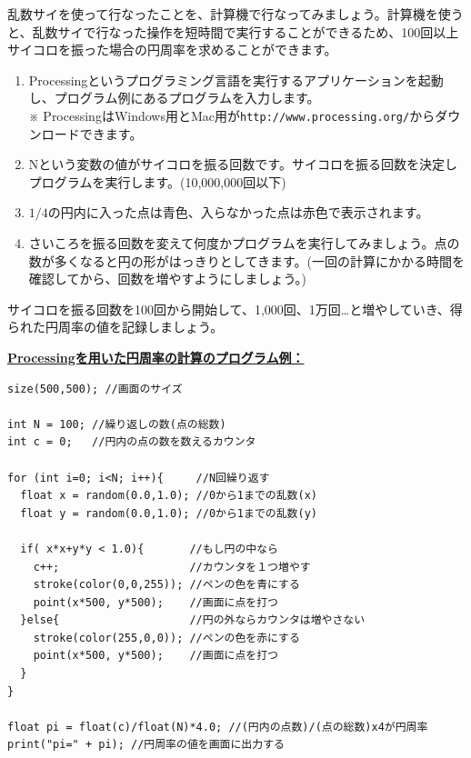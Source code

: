 
乱数サイを使って行なったことを、計算機で行なってみましょう。計算機を使う
と、乱数サイで行なった操作を短時間で実行することができるため、100回以上
サイコロを振った場合の円周率を求めることができます。

\begin{enumerate}

\item Processingというプログラミング言語を実行するアプリケーションを起動し、プログラム例にあるプログラムを入力します。\\
※  ProcessingはWindows用とMac用が{\tt http://www.processing.org/}からダウンロードできます。

\item Nという変数の値がサイコロを振る回数です。サイコロを振る回数を決定しプログラムを実行します。(10,000,000回以下)

\item $1/4$の円内に入った点は青色、入らなかった点は赤色で表示されます。

\item さいころを振る回数を変えて何度かプログラムを実行してみましょう。点の数が多くなると円の形がはっきりとしてきます。(一回の計算にかかる時間を確認してから、回数を増やすようにしましょう。)

\end{enumerate}

サイコロを振る回数を100回から開始して、1,000回、1万回…と増やしていき、得 
られた円周率の値を記録しましょう。

\bigskip

\underline{\bf Processingを用いた円周率の計算のプログラム例：}



\begin{screen}
\begin{verbatim}
size(500,500); //画面のサイズ

int N = 100; //繰り返しの数(点の総数)
int c = 0;   //円内の点の数を数えるカウンタ

for (int i=0; i<N; i++){     //N回繰り返す
  float x = random(0.0,1.0); //0から1までの乱数(x)
  float y = random(0.0,1.0); //0から1までの乱数(y)
  
  if( x*x+y*y < 1.0){       //もし円の中なら
    c++;                    //カウンタを１つ増やす
    stroke(color(0,0,255)); //ペンの色を青にする
    point(x*500, y*500);    //画面に点を打つ
  }else{                    //円の外ならカウンタは増やさない
    stroke(color(255,0,0)); //ペンの色を赤にする
    point(x*500, y*500);    //画面に点を打つ
  }
}

float pi = float(c)/float(N)*4.0; //(円内の点数)/(点の総数)x4が円周率
print("pi=" + pi); //円周率の値を画面に出力する
\end{verbatim}
\end{screen}
